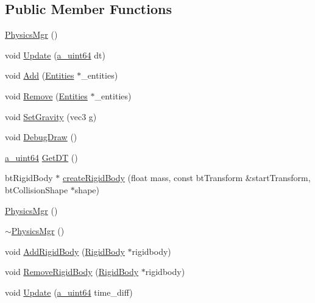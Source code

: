 \subsection*{Public Member Functions}
\begin{DoxyCompactItemize}
\item 
\hyperlink{class_agmd_1_1_physics_mgr_a865b1468ecb44d77f18d5463abe5f1c5}{Physics\+Mgr} ()
\item 
void \hyperlink{class_agmd_1_1_physics_mgr_af55b10a59198035e790c1713c8ebab3d}{Update} (\hyperlink{_common_defines_8h_a6c5192ec3c55d6e5b13d2dbaa082bdea}{a\+\_\+uint64} dt)
\item 
void \hyperlink{class_agmd_1_1_physics_mgr_aff2bd4dfab3960c274d71fce7b4f17c4}{Add} (\hyperlink{class_agmd_1_1_entities}{Entities} $\ast$\+\_\+entities)
\item 
void \hyperlink{class_agmd_1_1_physics_mgr_a56b400f17d6ac3c401f7b72ef9f086ac}{Remove} (\hyperlink{class_agmd_1_1_entities}{Entities} $\ast$\+\_\+entities)
\item 
void \hyperlink{class_agmd_1_1_physics_mgr_ac7c84371d878852c80af08b7fccd8cb1}{Set\+Gravity} (vec3 \hyperlink{_examples_2_planet_2_app_8cpp_a8cf17d727651616de6f2b79ef32170cd}{g})
\item 
void \hyperlink{class_agmd_1_1_physics_mgr_ac8096f3ccbac923cde88f6160b71b060}{Debug\+Draw} ()
\item 
\hyperlink{_common_defines_8h_a6c5192ec3c55d6e5b13d2dbaa082bdea}{a\+\_\+uint64} \hyperlink{class_agmd_1_1_physics_mgr_a343aba49763502d0ea4d6e4fcef3f52d}{Get\+D\+T} ()
\item 
bt\+Rigid\+Body $\ast$ \hyperlink{class_agmd_1_1_physics_mgr_aff67b70a599ce21b253095cc60644a3d}{create\+Rigid\+Body} (float mass, const bt\+Transform \&start\+Transform, bt\+Collision\+Shape $\ast$shape)
\item 
\hyperlink{class_agmd_1_1_physics_mgr_a865b1468ecb44d77f18d5463abe5f1c5}{Physics\+Mgr} ()
\item 
\hyperlink{class_agmd_1_1_physics_mgr_abcf14beb1eb8d37f9126cdede01f9e6c}{$\sim$\+Physics\+Mgr} ()
\item 
void \hyperlink{class_agmd_1_1_physics_mgr_a8288fff05fd378dc5b8d1af1ce9b96b7}{Add\+Rigid\+Body} (\hyperlink{class_agmd_1_1_rigid_body}{Rigid\+Body} $\ast$rigidbody)
\item 
void \hyperlink{class_agmd_1_1_physics_mgr_ab8f2fe17bca890679583b682d0fe4f1f}{Remove\+Rigid\+Body} (\hyperlink{class_agmd_1_1_rigid_body}{Rigid\+Body} $\ast$rigidbody)
\item 
void \hyperlink{class_agmd_1_1_physics_mgr_acd83c345a83d3d5eebebb71d17548a7a}{Update} (\hyperlink{_common_defines_8h_a6c5192ec3c55d6e5b13d2dbaa082bdea}{a\+\_\+uint64} time\+\_\+diff)
\end{DoxyCompactItemize}
